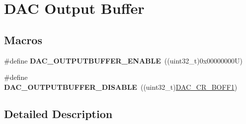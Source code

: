 \hypertarget{group___d_a_c__output__buffer}{}\section{D\+AC Output Buffer}
\label{group___d_a_c__output__buffer}
\subsection*{Macros}
\begin{DoxyCompactItemize}
\item 
\mbox{\label{group___d_a_c__output__buffer_gadbd90109641c5d95604c24f67a22f381}} 
\#define {\bfseries D\+A\+C\+\_\+\+O\+U\+T\+P\+U\+T\+B\+U\+F\+F\+E\+R\+\_\+\+E\+N\+A\+B\+LE}~((uint32\+\_\+t)0x00000000\+U)
\item 
\mbox{\label{group___d_a_c__output__buffer_ga25f52df123a62f5046172dc159c7b38e}} 
\#define {\bfseries D\+A\+C\+\_\+\+O\+U\+T\+P\+U\+T\+B\+U\+F\+F\+E\+R\+\_\+\+D\+I\+S\+A\+B\+LE}~((uint32\+\_\+t)\mbox{\hyperlink{group___peripheral___registers___bits___definition_ga0b1e2b83ae1ab889cb1e34a99746c9d8}{D\+A\+C\+\_\+\+C\+R\+\_\+\+B\+O\+F\+F1}})
\end{DoxyCompactItemize}


\subsection{Detailed Description}
